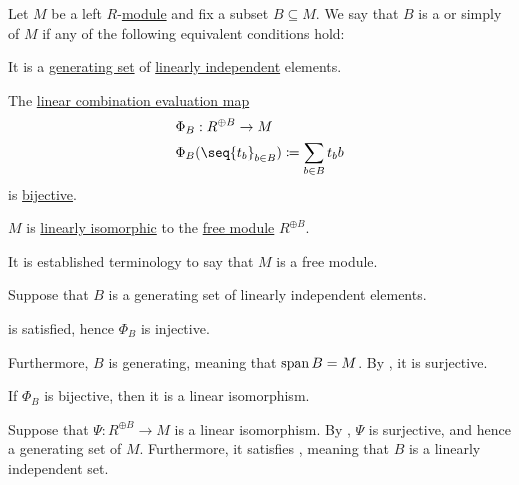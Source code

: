 \begin{definition}\label{def:hamel_basis}\mimprovised
  Let \( M \) be a left \( R \)-\hyperref[def:module]{module} and fix a subset \( B \subseteq M \). We say that \( B \) is a  or simply  of \( M \) if any of the following equivalent conditions hold:

  \begin{thmenum}
     It is a \hyperref[thm:span_via_linear_combinations]{generating set} of \hyperref[def:linear_dependence]{linearly independent} elements.

     The \hyperref[thm:free_semimodule_universal_property]{linear combination evaluation map}
    \begin{equation*}
      \begin{aligned}
        &\Phi_B: R^{\oplus B} \to M \\
        &\Phi_B( \seq{ t_b }_{b \in B} ) \coloneqq \sum_{b \in B} t_b b
      \end{aligned}
    \end{equation*}
    is \hyperref[def:function_invertibility/bijective]{bijective}.

     \( M \) is \hyperref[def:semimodule/homomorphism]{linearly isomorphic} to the \hyperref[def:free_semimodule]{free module} \( R^{\oplus B} \).

    It is established terminology to say that \( M \) is a free module.
  \end{thmenum}
\end{definition}
\begin{defproof}
   Suppose that \( B \) is a generating set of linearly independent elements.

   is satisfied, hence \( \Phi_B \) is injective.

  Furthermore, \( B \) is generating, meaning that \( \operatorname{span} B = M \). By , it is surjective.

   If \( \Phi_B \) is bijective, then it is a linear isomorphism.

   Suppose that \( \Psi: R^{\oplus B} \to M \) is a linear isomorphism. By , \( \Psi \) is surjective, and hence a generating set of \( M \). Furthermore, it satisfies , meaning that \( B \) is a linearly independent set.
\end{defproof}


